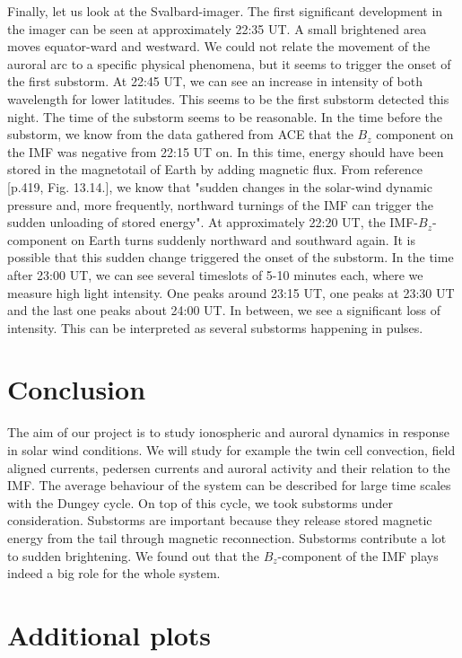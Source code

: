 \documentclass[10pt,a4paper]{article}
\begin{document}
Finally, let us look at the Svalbard-imager. The first significant development in the imager can be seen at approximately 22:35 UT. A small brightened area moves equator-ward and westward. We could not relate the movement of the auroral arc to a specific physical phenomena, but it seems to trigger the onset of the first substorm. At 22:45 UT, we can see an increase in intensity of both wavelength for lower latitudes. This seems to be the first substorm detected this night. The time of the substorm seems to be reasonable. In the time before the substorm, we know from the data gathered from ACE that the $B_z$ component on the IMF was negative from 22:15 UT on. In this time, energy should have been stored in the magnetotail of Earth by adding magnetic flux. 
From reference \cite{Buch2}[p.419, Fig. 13.14.], we know that "sudden changes in the solar-wind dynamic pressure and, more frequently, northward turnings of the IMF can trigger the sudden unloading of stored energy". At approximately 22:20 UT, the IMF-$B_z$-component on Earth turns suddenly northward and southward again. It is possible that this sudden change triggered the onset of the substorm. In the time after 23:00 UT, we can see several timeslots of 5-10 minutes each, where we measure high light intensity. One peaks around 23:15 UT, one peaks at 23:30 UT and the last one peaks about 24:00 UT. In between, we see a significant loss of intensity. 
This can be interpreted as several substorms happening in pulses. 

\section{Conclusion}

The aim of our project is to study ionospheric and auroral dynamics in response in solar wind conditions. We will study for example the twin cell convection, field aligned currents, pedersen currents and auroral activity and their relation to the IMF. 
The average behaviour of the system can be described for large time scales with the Dungey cycle. On top of this cycle, we took substorms under consideration. Substorms are important because they release stored magnetic energy from the tail through magnetic reconnection. Substorms contribute a lot to sudden brightening. 
We found out that the $B_z$-component of the IMF plays indeed a big role for the whole system. 


\newpage
\section{Additional plots}
\end{document}
